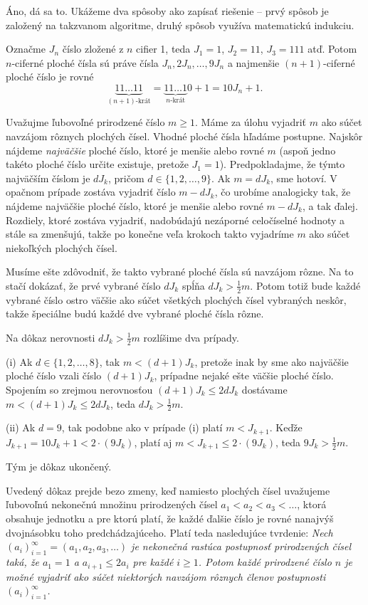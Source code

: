 {%
Áno, dá sa to.
Ukážeme dva spôsoby ako zapísať riešenie -- prvý spôsob je založený na takzvanom  algoritme, druhý spôsob využíva matematickú indukciu.

Označme $J_n$ číslo zložené z $n$ cifier 1, teda $J_1=1$, $J_2=11$, $J_3=111$ atď.
Potom $n$-ciferné ploché čísla sú práve čísla $J_n,2J_n,\ldots,9J_n$ a najmenšie $(n+1)$-ciferné ploché číslo je rovné
$$\underbrace{11\ldots11}_{\text{$(n+1)$-krát}} = \underbrace{11\ldots1}_{\text{$n$-krát}}0+1=10J_n+1.
$$

Uvažujme ľubovoľné prirodzené číslo $m\ge 1$. Máme za úlohu vyjadriť $m$ ako súčet navzájom rôznych plochých čísel.
Vhodné ploché čísla hľadáme postupne.
Najskôr nájdeme {\em najväčšie} ploché číslo, ktoré je menšie alebo rovné $m$ (aspoň jedno takéto ploché číslo určite existuje, pretože $J_1=1$).
Predpokladajme, že týmto najväčším číslom je $dJ_k$, pričom $d\in\{1,2,\ldots,9\}$.
Ak $m=dJ_k$, sme hotoví.
V opačnom prípade zostáva vyjadriť číslo $m-dJ_k$, čo urobíme analogicky tak, že nájdeme najväčšie ploché číslo, ktoré je menšie alebo rovné $m-dJ_k$, a tak ďalej.
Rozdiely, ktoré zostáva vyjadriť, nadobúdajú nezáporné celočíselné hodnoty a stále sa zmenšujú, takže po konečne veľa krokoch takto vyjadríme $m$ ako súčet niekoľkých plochých čísel.

Musíme ešte zdôvodniť, že takto vybrané ploché čísla sú navzájom rôzne.
Na to stačí dokázať, že prvé vybrané číslo $dJ_k$ spĺňa $dJ_k>\frac12m$.
Potom totiž bude každé vybrané číslo ostro väčšie ako súčet všetkých plochých čísel vybraných neskôr, takže špeciálne budú každé dve vybrané ploché čísla rôzne.

Na dôkaz nerovnosti $dJ_k>\frac12m$ rozlíšime dva prípady.

\smallskip
\item{(i)} Ak $d\in\{1,2,\ldots, 8\}$, tak $m<(d+1)J_k$, pretože inak by sme ako najväčšie ploché číslo vzali číslo $(d+1)J_k$, prípadne nejaké ešte väčšie ploché číslo. Spojením so zrejmou nerovnosťou $(d+1)J_k\le 2dJ_k$ dostávame $m<(d+1)J_k\le 2dJ_k$, teda $dJ_k>\frac12m$.
\item{(ii)} Ak $d=9$, tak podobne ako v prípade (i) platí $m<J_{k+1}$. Keďže $J_{k+1}=10J_k+1<2\cdot (9J_k)$, platí aj $m<J_{k+1}\le 2\cdot (9J_k)$, teda $9J_k>\frac12m$.

\smallskip\noindent
Tým je dôkaz ukončený.


\poznamka
Uvedený dôkaz prejde bezo zmeny, keď namiesto plochých čísel uvažujeme ľubovoľnú nekonečnú množinu prirodzených čísel $a_1<a_2<a_3<\ldots$, ktorá obsahuje jednotku a pre ktorú platí, že každé ďalšie číslo je rovné nanajvýš dvojnásobku toho predchádzajúceho. Platí teda nasledujúce tvrdenie:
{\sl Nech $(a_i)_{i=1}^\infty = (a_1,a_2,a_3,\ldots)$ je nekonečná rastúca postupnosť prirodzených čísel taká, že $a_1=1$ a $a_{i+1}\le 2a_i$ pre každé $i\ge 1$. Potom každé prirodzené číslo $n$ je možné vyjadriť ako súčet niektorých navzájom rôznych členov postupnosti $(a_i)_{i=1}^\infty$.}


}
